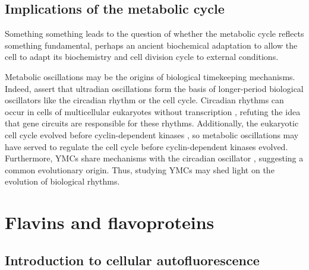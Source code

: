 \subsection{Implications of the metabolic cycle}
\label{subsec:intro-ymc-implications}

Something something leads to the question of whether the metabolic cycle reflects something fundamental, perhaps an ancient biochemical adaptation to allow the cell to adapt its biochemistry and cell division cycle to external conditions.

Metabolic oscillations may be the origins of biological timekeeping mechanisms.
Indeed, \citet{lloydRedoxRhythmicityClocks2007} assert that ultradian oscillations form the basis of longer-period biological oscillators like the circadian rhythm or the cell cycle. %
Circadian rhythms can occur in cells of multicellular eukaryotes without transcription \citep{oneillCircadianRhythmsPersist2011}, refuting the idea that gene circuits are responsible for these rhythms.
Additionally, the eukaryotic cell cycle evolved before cyclin-dependent kinases \citep{papagiannakisAutonomousMetabolicOscillations2017}, so metabolic oscillations may have served to regulate the cell cycle before cyclin-dependent kinases evolved.
Furthermore, YMCs share mechanisms with the circadian oscillator \citep{caustonMetabolicCyclesYeast2015,arataQuantitativeStudiesCellDivision2019}, suggesting a common evolutionary origin.
Thus, studying YMCs may shed light on the evolution of biological rhythms.

\section{Flavins and flavoproteins}
\label{sec:intro-flavin}

\subsection{Introduction to cellular autofluorescence}
\label{subsec:intro-flavin-autofluo}

